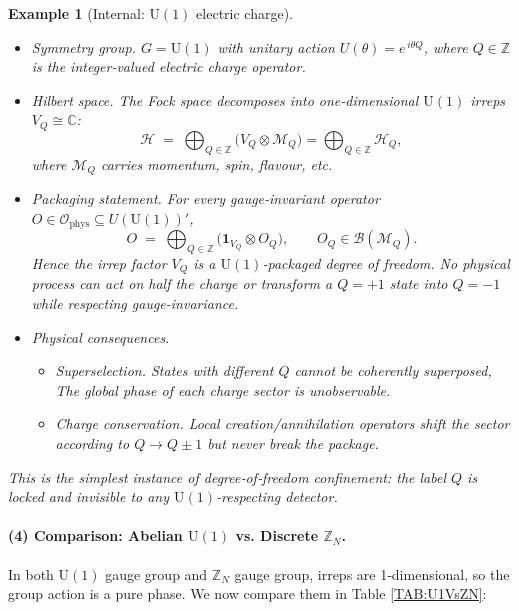 \documentclass[12pt,a4paper]{article}
\newtheorem{example}{Example}
\begin{document}
\begin{example}[Internal: $\mathrm{U}(1)$ electric charge]
	\label{EX:U1Packaging}
	
	\leavevmode
	\begin{itemize}
		\item Symmetry group.
		$G=\mathrm{U}(1)$ with unitary action $U(\theta)=e^{\,i\theta Q}$, where $Q\in\mathbb Z$ is the integer‑valued electric charge operator.
		
		\item Hilbert space.
		The Fock space decomposes into one‑dimensional $\mathrm{U}(1)$ irreps
		$
		V_Q \cong \mathbb C
		$:
		\[
		\mathcal H
		\;=\;
		\bigoplus_{Q\in\mathbb Z}
		\bigl(V_Q \otimes\mathcal M_Q\bigr)
		=
		\bigoplus_{Q\in\mathbb Z}
		\mathcal H_Q,
		\]
		where $\mathcal M_Q$ carries momentum, spin, flavour, etc.
		
		\item Packaging statement.
		For every gauge‑invariant operator
		$O\in\mathcal O_{\mathrm{phys}}\subseteq U(\mathrm{U}(1))'$,
		\[
		O
		\;=\;
		\bigoplus_{Q\in\mathbb Z}
		\bigl(\mathbf 1_{V_Q}\otimes O_Q\bigr),
		\qquad
		O_Q\in\mathcal B(\mathcal M_Q).
		\]
		Hence the irrep factor $V_Q$ is a $\mathrm{U}(1)$‑packaged degree of freedom.
		No physical process can act on half the charge or transform a
		$Q=+1$ state into $Q=-1$ while respecting gauge-invariance.
		
		\item Physical consequences.
		\begin{itemize}
			\item Superselection.
			States with different $Q$ cannot be	coherently superposed,
			The global phase of each charge sector is unobservable.
			
			\item Charge conservation.
			Local creation/annihilation	operators shift the sector according to
			$Q\!\to\!Q\pm1$ but never break the package.
		\end{itemize}
	\end{itemize}		
	This is the simplest instance of degree‑of‑freedom confinement:
	the label $Q$ is locked and invisible to any $\mathrm{U}(1)$‑respecting detector.
\end{example}


\paragraph{(4) Comparison: Abelian $\mathrm{U}(1)$ vs. Discrete $\mathbb{Z}_N$.}
In both $\mathrm{U}(1)$ gauge group and $\mathbb{Z}_N$ gauge group, irreps are 1‐dimensional, so the group action is a pure phase.
We now compare them in Table \ref{TAB:U1VsZN}:
\end{document}
